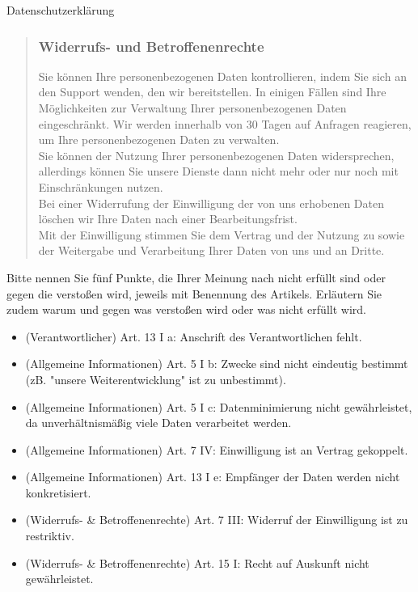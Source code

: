 \documentclass{article}
\begin{document}
\begin{exercise}{Datenschutzerklärung}
\begin{quote}
    \subsubsection*{Widerrufs- und Betroffenenrechte}
    Sie können Ihre personenbezogenen Daten kontrollieren, indem Sie sich an den Support wenden, den wir bereitstellen. In einigen Fällen sind Ihre Möglichkeiten zur Verwaltung Ihrer personenbezogenen Daten eingeschränkt. Wir werden innerhalb von 30 Tagen auf Anfragen reagieren, um Ihre personenbezogenen Daten zu verwalten.\\
    Sie können der Nutzung Ihrer personenbezogenen Daten widersprechen, allerdings können Sie unsere Dienste dann nicht mehr oder nur noch mit Einschränkungen nutzen.\\
    Bei einer Widerrufung der Einwilligung der von uns erhobenen Daten löschen wir Ihre Daten nach einer Bearbeitungsfrist.
    \vspace{1em}\\
    Mit der Einwilligung stimmen Sie dem Vertrag und der Nutzung zu sowie der Weitergabe und Verarbeitung Ihrer Daten von uns und an Dritte.
  \end{quote}

  Bitte nennen Sie fünf Punkte, die Ihrer Meinung nach nicht erfüllt sind oder gegen die verstoßen wird, jeweils mit Benennung des Artikels. Erläutern Sie zudem warum und gegen was verstoßen wird oder was nicht erfüllt wird.

  \begin{solution}
    \begin{itemize}
      \item (Verantwortlicher) Art. 13 I a: Anschrift des Verantwortlichen fehlt.
      \item (Allgemeine Informationen) Art. 5 I b: Zwecke sind nicht eindeutig bestimmt (zB. "unsere Weiterentwicklung" ist zu unbestimmt).
      \item (Allgemeine Informationen) Art. 5 I c: Datenminimierung nicht gewährleistet, da unverhältnismäßig viele Daten verarbeitet werden.
      \item (Allgemeine Informationen) Art. 7 IV: Einwilligung ist an Vertrag gekoppelt.
      \item (Allgemeine Informationen) Art. 13 I e: Empfänger der Daten werden nicht konkretisiert.
      \item (Widerrufs- \& Betroffenenrechte) Art. 7 III: Widerruf der Einwilligung ist zu restriktiv.
      \item (Widerrufs- \& Betroffenenrechte) Art. 15 I: Recht auf Auskunft nicht gewährleistet.
    \end{itemize}
  \end{solution}
\end{exercise}
\end{document}
